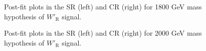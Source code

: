 \begin{figure}[H]
  \centering
  \caption{Post-fit plots in the SR (left) and CR (right) for 1800 GeV mass hypothesis of $W'_{\text{R}}$ signal.}
  \label{fig:Postfit_WpRH1800_Asimov}
\end{figure}
\begin{figure}[H]
  \centering
  \caption{Post-fit plots in the SR (left) and CR (right) for 2000 GeV mass hypothesis of $W'_{\text{R}}$ signal.}
  \label{fig:Postfit_WpRH2000_Asimov}
\end{figure}
